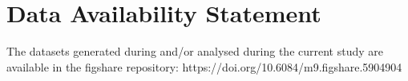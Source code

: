 \section{Data Availability Statement}
\label{sec:artifact}

The datasets generated during and/or analysed during the current study are available in the figshare repository: https://doi.org/10.6084/m9.figshare.5904904~\cite{katis2018tacasartifact}
